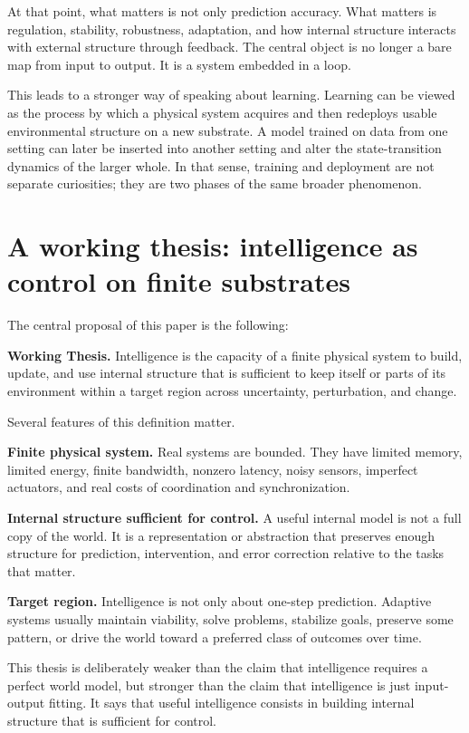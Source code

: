 \documentclass[11pt]{article}
\begin{document}
At that point, what matters is not only prediction accuracy. What matters is regulation, stability, robustness, adaptation, and how internal structure interacts with external structure through feedback. The central object is no longer a bare map from input to output. It is a system embedded in a loop.

This leads to a stronger way of speaking about learning. Learning can be viewed as the process by which a physical system acquires and then redeploys usable environmental structure on a new substrate. A model trained on data from one setting can later be inserted into another setting and alter the state-transition dynamics of the larger whole. In that sense, training and deployment are not separate curiosities; they are two phases of the same broader phenomenon.

\section{A working thesis: intelligence as control on finite substrates}


The central proposal of this paper is the following:

\textbf{Working Thesis.} Intelligence is the capacity of a finite physical system to build, update, and use internal structure that is sufficient to keep itself or parts of its environment within a target region across uncertainty, perturbation, and change.

Several features of this definition matter.

\textbf{Finite physical system.} Real systems are bounded. They have limited memory, limited energy, finite bandwidth, nonzero latency, noisy sensors, imperfect actuators, and real costs of coordination and synchronization.

\textbf{Internal structure sufficient for control.} A useful internal model is not a full copy of the world. It is a representation or abstraction that preserves enough structure for prediction, intervention, and error correction relative to the tasks that matter.

\textbf{Target region.} Intelligence is not only about one-step prediction. Adaptive systems usually maintain viability, solve problems, stabilize goals, preserve some pattern, or drive the world toward a preferred class of outcomes over time.

This thesis is deliberately weaker than the claim that intelligence requires a perfect world model, but stronger than the claim that intelligence is just input-output fitting. It says that useful intelligence consists in building internal structure that is sufficient for control.
\end{document}
